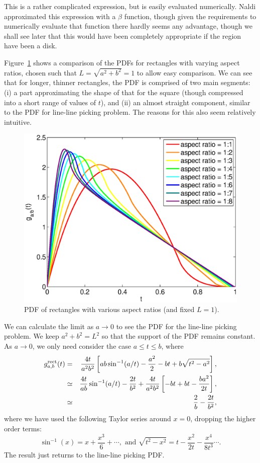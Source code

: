 This is a rather complicated expression, but is easily evaluated
numerically.  Naldi \cite{m.naldi05:_connec_of_waxman_graph}
approximated this expression with a $\beta$ function, though given the
requirements to numerically evaluate that function there hardly seems
any advantage, though we shall see later that this would have been
completely appropriate if the region have been a disk.

Figure~\ref{fig:rect_pdf_var} shows a comparison of the PDFs for
rectangles with varying aspect ratios, chosen such that $L = \sqrt{a^2
  + b^2} = 1$ to allow easy comparison. We can see that for longer,
thinner rectangles, the PDF is comprised of two main segments: (i) a
part approximating the shape of that for the square (though compressed
into a short range of values of $t$), and (ii) an almost straight
component, similar to the PDF for line-line picking problem. The
reasons for this also seem relatively intuitive.

\begin{figure}[htbp]
  \begin{center}
    \includegraphics[width=0.5\columnwidth]
          {../Matlab/Plots/LinePicking_plot_rect.eps}
    \caption{PDF of rectangles with various aspect
              ratios (and fixed $L=1$).}
    \label{fig:rect_pdf_var}
  \end{center} 
\vspace{-4mm}
\end{figure}

We can calculate the limit as $a \rightarrow 0$ to see the PDF for the
line-line picking problem.  We keep $a^2 + b^2 = L^2$ so that the
support of the PDF remains constant.  As $a \rightarrow 0$, we only
need consider the case $a \leq t \leq b$, where
\begin{eqnarray}
    g^{\rm rect}_{a,b}(t)
        & = & \frac{4 t}{a^2 b^2} 
                  \left[ a b \sin^{-1} (a/t) - \frac{a^2}{2} - b t + b\sqrt{t^2 - a^2} \right] , \nonumber \\
        & \simeq & \frac{4t }{a b} \sin^{-1} (a/t)
                   - \frac{2 t}{b^2}
                    + \frac{4 t}{a^2 b^2} \left[ -b t + b t - \frac{b a^2}{2 t} \right] , \nonumber \\
        & \simeq & \frac{2}{b}
                   - \frac{2 t}{b^2}, 
\end{eqnarray}
where we have used the following Taylor series around $x=0$, dropping
the higher order terms:
\[ \sin^{-1}(x) = x + \frac{x^3}{6} + \cdots, 
   \mbox{ and }
   \sqrt{t^2 - x^2} = t - \frac{x^2}{2t} - \frac{x^4}{8 t^3} \cdots .
\]
The result just returns to the line-line picking PDF.

